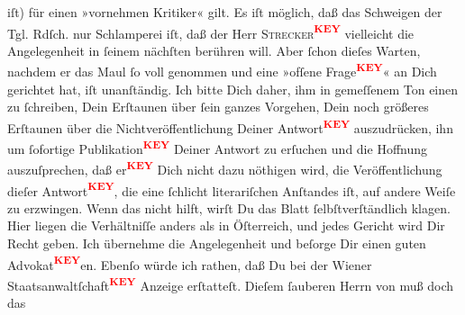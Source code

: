 \begin{ledgroupsized}[t]{13cm}
                    iſt) für einen »vornehmen Kritiker« gilt. Es iſt möglich, daß das {\pb}Schweigen der Tgl. Rdſch. nur Schlamperei iſt, daß der Herr \textsc{Strecker\textcolor{red}{\textsuperscript{\textbf{KEY}}}} vielleicht die Angelegenheit in ſeinem nächſten \label{K_L03205-3v}\label{K_L03205-3h} berühren will. Aber ſchon
                    dieſes Warten, nachdem er das Maul ſo voll genommen und eine »ofſene Frage\textcolor{red}{\textsuperscript{\textbf{KEY}}}« an Dich gerichtet hat, iſt
                    unanſtändig. Ich bitte Dich daher, ihm in gemeſſenem Ton einen \label{K_L03205-4v}\label{K_L03205-4h} zu ſchreiben, Dein Erſtaunen über ſein
                    ganzes Vorgehen, Dein noch größeres Erſtaunen über  die Nichtveröffentlichung Deiner Antwort\textcolor{red}{\textsuperscript{\textbf{KEY}}} auszudrücken, ihn um ſofortige Publikation\textcolor{red}{\textsuperscript{\textbf{KEY}}} Deiner Antwort zu
                    erſuchen und die Hoffnung auszuſprechen, daß {\pb}er\textcolor{red}{\textsuperscript{\textbf{KEY}}} Dich nicht dazu
                    nöthigen wird, die Veröffentlichung dieſer Antwort\textcolor{red}{\textsuperscript{\textbf{KEY}}}, die eine ſchlicht literariſchen Anſtandes iſt, auf
                    andere Weiſe zu erzwingen. Wenn das nicht hilft, wirſt Du das Blatt ſelbſtverſtändlich klagen. Hier liegen die
                    Verhältniſſe anders als in Öſterreich, und
                    jedes Gericht wird Dir Recht geben. Ich übernehme die Angelegenheit und beſorge
                    Dir einen guten Advokat\textcolor{red}{\textsuperscript{\textbf{KEY}}}en.
                    Ebenſo würde ich rathen, daß Du bei der Wiener Staatsanwaltſchaft\textcolor{red}{\textsuperscript{\textbf{KEY}}} Anzeige erſtatteſt.
                    Dieſem ſauberen Herrn von \label{K_L03205-5v}\label{K_L03205-5h} muß doch das

\end{ledgroupsized}

